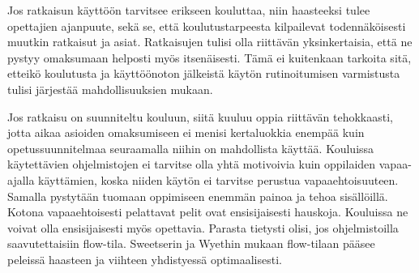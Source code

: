 \documentclass[utf8,bachelor]{gradu3}
\begin{document}
Jos ratkaisun käyttöön tarvitsee erikseen kouluttaa, niin haasteeksi tulee opettajien ajanpuute, sekä se, että koulutustarpeesta kilpailevat todennäköisesti muutkin ratkaisut ja asiat. Ratkaisujen tulisi olla riittävän yksinkertaisia, että ne pystyy omaksumaan helposti myös itsenäisesti. Tämä ei kuitenkaan tarkoita sitä, etteikö koulutusta ja käyttöönoton jälkeistä käytön rutinoitumisen varmistusta tulisi järjestää mahdollisuuksien mukaan.

Jos ratkaisu on suunniteltu kouluun, siitä kuuluu oppia riittävän tehokkaasti, jotta aikaa asioiden omaksumiseen ei menisi kertaluokkia enempää kuin opetussuunnitelmaa seuraamalla niihin on mahdollista käyttää. Kouluissa käytettävien ohjelmistojen ei tarvitse olla yhtä motivoivia kuin oppilaiden vapaa-ajalla käyttämien, koska niiden käytön ei tarvitse perustua vapaaehtoisuuteen. Samalla pystytään tuomaan oppimiseen enemmän painoa ja tehoa sisällöillä. Kotona vapaaehtoisesti pelattavat pelit ovat ensisijaisesti hauskoja. Kouluissa ne voivat olla ensisijaisesti myös opettavia. Parasta tietysti olisi, jos ohjelmistoilla saavutettaisiin flow-tila. Sweetserin ja Wyethin mukaan flow-tilaan pääsee peleissä haasteen ja viihteen yhdistyessä optimaalisesti. \parencite[][]{flow}


\printbibliography
\end{document}
